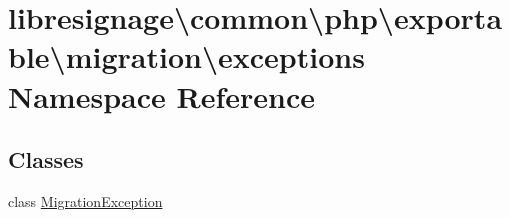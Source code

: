 \hypertarget{namespacelibresignage_1_1common_1_1php_1_1exportable_1_1migration_1_1exceptions}{}\section{libresignage\textbackslash{}common\textbackslash{}php\textbackslash{}exportable\textbackslash{}migration\textbackslash{}exceptions Namespace Reference}
\label{namespacelibresignage_1_1common_1_1php_1_1exportable_1_1migration_1_1exceptions}
\subsection*{Classes}
\begin{DoxyCompactItemize}
\item 
class \hyperlink{classlibresignage_1_1common_1_1php_1_1exportable_1_1migration_1_1exceptions_1_1MigrationException}{Migration\+Exception}
\end{DoxyCompactItemize}
